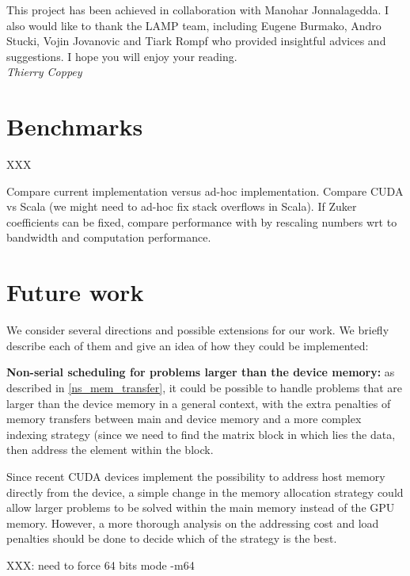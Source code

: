 \documentclass[11pt]{article}
\begin{document}
\vfill
This project has been achieved in collaboration with Manohar Jonnalagedda. I also would like to thank the LAMP team, including Eugene Burmako, Andro Stucki, Vojin Jovanovic and Tiark Rompf who provided insightful advices and suggestions. I hope you will enjoy your reading. \vspace{.3cm}\\
\textit{Thierry Coppey}

\newpage
\setcounter{tocdepth}{2} \tableofcontents





\section{Benchmarks}
{\color{red} XXX}

Compare current implementation versus ad-hoc implementation. Compare CUDA vs Scala (we might need to ad-hoc fix stack overflows in Scala).
If Zuker coefficients can be fixed, compare performance with \cite{adp_gpu} by rescaling numbers wrt to bandwidth and computation performance.

\section{Future work}
We consider several directions and possible extensions for our work. We briefly describe each of them and give an idea of how they could be implemented:\ol
\item \textbf{Non-serial scheduling for problems larger than the device memory:} as described in \ref{ns_mem_transfer}, it could be possible to handle problems that are larger than the device memory in a general context, with the extra penalties of memory transfers between main and device memory and a more complex indexing strategy (since we need to find the matrix block in which lies the data, then address the element within the block.

Since recent CUDA devices implement the possibility to address host memory directly from the device, a simple change in the memory allocation strategy could allow larger problems to be solved within the main memory instead of the GPU memory. However, a more thorough analysis on the addressing cost and load penalties should be done to decide which of the strategy is the best.

{\color{red} XXX: need to force 64 bits mode -m64}

\end{document}
